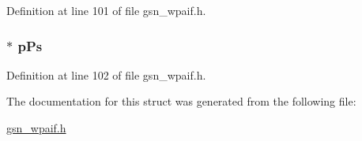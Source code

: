 Definition at line 101 of file gsn\_\-wpaif.h.

\hypertarget{a00424_a916d4c92b0a0046ea32524b00ef14469}{
\subsubsection[{pPs}]{$\ast$ {\bf pPs}}}
\label{a00424_a916d4c92b0a0046ea32524b00ef14469}


Definition at line 102 of file gsn\_\-wpaif.h.



The documentation for this struct was generated from the following file:\begin{DoxyCompactItemize}
\item 
\hyperlink{a00615}{gsn\_\-wpaif.h}\end{DoxyCompactItemize}
